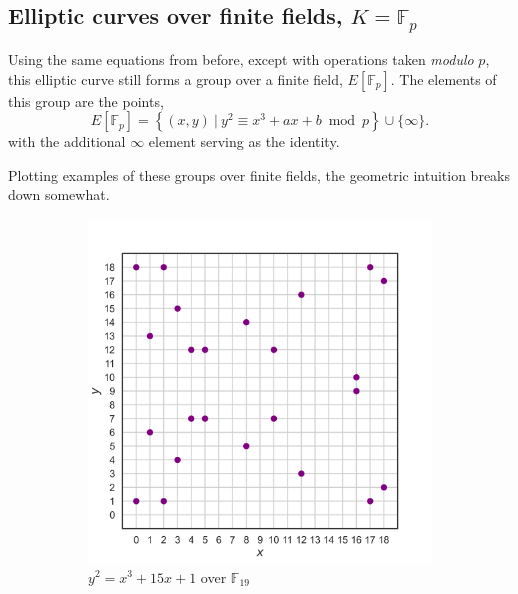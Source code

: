 \documentclass[11pt, a4paper]{report}
\newcommand{\field}{\mathbb{F}}
\begin{document}
\subsection{Elliptic curves over finite fields, $K = \field_p$}

Using the same equations from before, except with operations taken \textit{modulo} $p$, this elliptic curve still forms a group over a finite field, $E[\field_p]$. The elements of this group are the points, 
\[ E[\field_p] = \left\lbrace (x,y)\ |\ y^2 \equiv x^3 + ax + b \bmod p \right\rbrace \cup \lbrace \infty \rbrace. \]
with the additional $\infty$ element serving as the identity.

Plotting examples of these groups over finite fields, the geometric intuition breaks down somewhat.
\begin{figure}[ht]
\centering
\begin{subfigure}{0.49\textwidth}
\centering
\includegraphics[width = \textwidth]{krationalpoints19.png}
\caption{$y^2 = x^3 + 15x + 1$ over $\field_{19}$}
\label{fig:left}
\end{subfigure}
\begin{subfigure}{0.49\textwidth}
\centering

\end{subfigure}
\end{figure}
\end{document}
